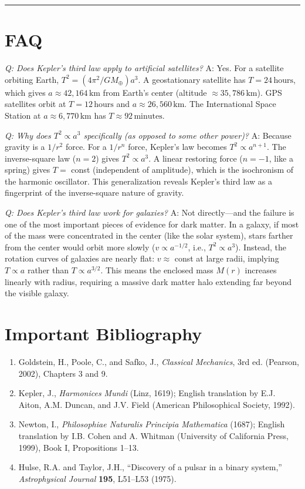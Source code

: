 \bigskip
\hrule
\bigskip
\section*{FAQ}

\textit{Q: Does Kepler's third law apply to artificial satellites?}
A: Yes. For a satellite orbiting Earth, $T^2 = (4\pi^2/GM_\oplus)a^3$. A geostationary satellite has $T = 24\,\text{hours}$, which gives $a \approx 42{,}164\,\text{km}$ from Earth's center (altitude $\approx 35{,}786\,\text{km}$). GPS satellites orbit at $T = 12\,\text{hours}$ and $a \approx 26{,}560\,\text{km}$. The International Space Station at $a \approx 6{,}770\,\text{km}$ has $T \approx 92\,\text{minutes}$.

\textit{Q: Why does $T^2 \propto a^3$ specifically (as opposed to some other power)?}
A: Because gravity is a $1/r^2$ force. For a $1/r^n$ force, Kepler's law becomes $T^2 \propto a^{n+1}$. The inverse-square law ($n = 2$) gives $T^2 \propto a^3$. A linear restoring force ($n = -1$, like a spring) gives $T = $ const (independent of amplitude), which is the isochronism of the harmonic oscillator. This generalization reveals Kepler's third law as a fingerprint of the inverse-square nature of gravity.

\textit{Q: Does Kepler's third law work for galaxies?}
A: Not directly---and the failure is one of the most important pieces of evidence for dark matter. In a galaxy, if most of the mass were concentrated in the center (like the solar system), stars farther from the center would orbit more slowly ($v \propto a^{-1/2}$, i.e., $T^2 \propto a^3$). Instead, the rotation curves of galaxies are nearly flat: $v \approx $ const at large radii, implying $T \propto a$ rather than $T \propto a^{3/2}$. This means the enclosed mass $M(r)$ increases linearly with radius, requiring a massive dark matter halo extending far beyond the visible galaxy.
\section*{Important Bibliography}
\begin{enumerate}
\item Goldstein, H., Poole, C., and Safko, J., \textit{Classical Mechanics}, 3rd ed. (Pearson, 2002), Chapters 3 and 9.
\item Kepler, J., \textit{Harmonices Mundi} (Linz, 1619); English translation by E.J. Aiton, A.M. Duncan, and J.V. Field (American Philosophical Society, 1992).
\item Newton, I., \textit{Philosophiae Naturalis Principia Mathematica} (1687); English translation by I.B. Cohen and A. Whitman (University of California Press, 1999), Book I, Propositions 1--13.
\item Hulse, R.A. and Taylor, J.H., ``Discovery of a pulsar in a binary system,'' \textit{Astrophysical Journal} \textbf{195}, L51--L53 (1975).
\end{enumerate}

